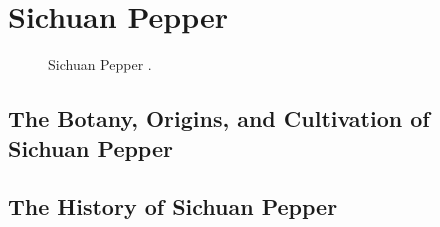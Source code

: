 \section{Sichuan Pepper}
\label{sec:sichuan_pepper}



\begin{figure}[!ht]
	\vspace{-4ex}
	\centering
	\hfill
	\hfill
	\caption{Sichuan Pepper \taxon{}.}
	\label{fig:sichuan_pepper_imgs}
\end{figure}

\subsection{The Botany, Origins, and Cultivation of Sichuan Pepper}

\subsection{The History of Sichuan Pepper}

